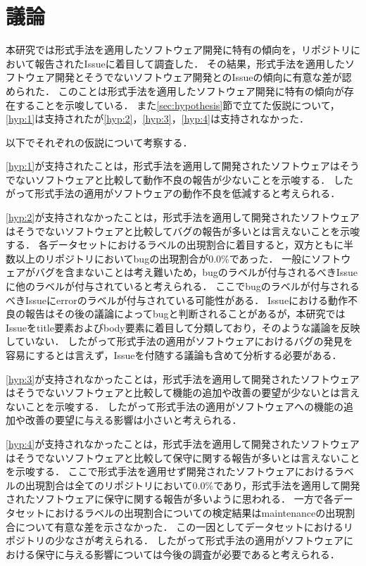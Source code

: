 \documentclass[main]{subfiles}
\begin{document}
\chapter{議論}

本研究では形式手法を適用したソフトウェア開発に特有の傾向を，リポジトリにおいて報告されたIssueに着目して調査した．
その結果，形式手法を適用したソフトウェア開発とそうでないソフトウェア開発とのIssueの傾向に有意な差が認められた．
このことは形式手法を適用したソフトウェア開発に特有の傾向が存在することを示唆している．
また\ref{sec:hypothesis}節で立てた仮説について，\ref{hyp:1}は支持されたが\ref{hyp:2}，\ref{hyp:3}，\ref{hyp:4}は支持されなかった．

以下でそれぞれの仮説について考察する．

\ref{hyp:1}が支持されたことは，形式手法を適用して開発されたソフトウェアはそうでないソフトウェアと比較して動作不良の報告が少ないことを示唆する．
したがって形式手法の適用がソフトウェアの動作不良を低減すると考えられる．

\ref{hyp:2}が支持されなかったことは，形式手法を適用して開発されたソフトウェアはそうでないソフトウェアと比較してバグの報告が多いとは言えないことを示唆する．
各データセットにおけるラベルの出現割合に着目すると，双方ともに半数以上のリポジトリにおいてbugの出現割合が0.0\%であった．
一般にソフトウェアがバグを含まないことは考え難いため，bugのラベルが付与されるべきIssueに他のラベルが付与されていると考えられる．
ここでbugのラベルが付与されるべきIssueにerrorのラベルが付与されている可能性がある．
Issueにおける動作不良の報告はその後の議論によってbugと判断されることがあるが，本研究ではIssueをtitle要素およびbody要素に着目して分類しており，そのような議論を反映していない．
したがって形式手法の適用がソフトウェアにおけるバグの発見を容易にするとは言えず，Issueを付随する議論も含めて分析する必要がある．

\ref{hyp:3}が支持されなかったことは，形式手法を適用して開発されたソフトウェアはそうでないソフトウェアと比較して機能の追加や改善の要望が少ないとは言えないことを示唆する．
したがって形式手法の適用がソフトウェアへの機能の追加や改善の要望に与える影響は小さいと考えられる．

\ref{hyp:4}が支持されなかったことは，形式手法を適用して開発されたソフトウェアはそうでないソフトウェアと比較して保守に関する報告が多いとは言えないことを示唆する．
ここで形式手法を適用せず開発されたソフトウェアにおけるラベルの出現割合は全てのリポジトリにおいて0.0\%であり，形式手法を適用して開発されたソフトウェアに保守に関する報告が多いように思われる．
一方で各データセットにおけるラベルの出現割合についての検定結果はmaintenanceの出現割合について有意な差を示さなかった．
この一因としてデータセットにおけるリポジトリの少なさが考えられる．
したがって形式手法の適用がソフトウェアにおける保守に与える影響については今後の調査が必要であると考えられる．
\end{document}
